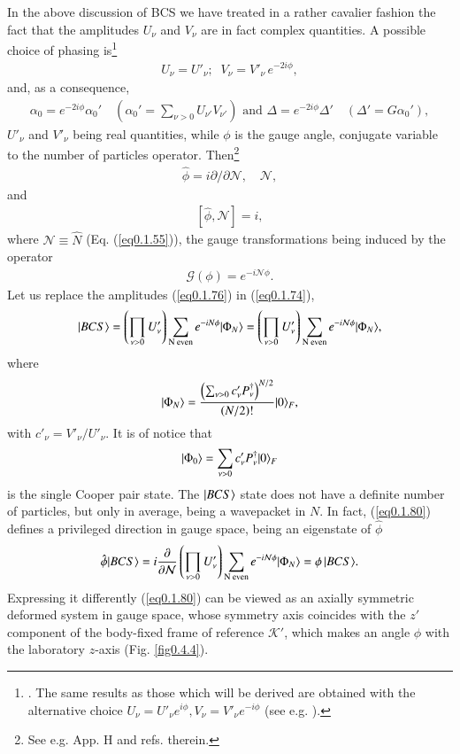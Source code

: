  In the above discussion of BCS we have treated in a rather cavalier fashion the fact that the amplitudes $U_\nu$ and $V_\nu$ are in fact complex quantities. A possible choice of phasing is\footnote{\cite{Schrieffer:73}. The same results as those which will be derived are obtained with the alternative choice $U_\nu=U'_\nu e^{i\phi},V_\nu=V'_\nu e^{-i\phi}$ (see e.g. \cite{Potel:13b}).} 
\begin{align}\label{eq0.1.76}
U_\nu=U'_\nu;\;\;V_\nu=V'_\nu\, e^{-2i\phi},
\end{align}
and, as a consequence, 
\begin{align}\label{eq0.1.76x}
\alpha_0=e^{-2i\phi}\alpha_0'\quad(\alpha_0'=\sum_{\nu>0}U_{\nu'}V_{\nu'})\text{ and } \Delta=e^{-2i\phi}\Delta'\quad(\Delta'=G\alpha_0'),
\end{align}
$U'_\nu$ and $V'_\nu$ being real quantities, while $\phi$ is the gauge angle, conjugate variable to the number of particles operator. Then\footnote{See e.g. \cite{Brink:05} App. H and refs. therein.}
\begin{align}\label{eq0.1.77}
\hat\phi=i\partial/\partial \mathcal N,\quad \mathcal N,
\end{align}
and
\begin{align}\label{eq0.1.78}
\left[\hat \phi,\mathcal N\right]=i,
\end{align}
where $\mathcal N\equiv\hat N$ (Eq. (\ref{eq0.1.55})), the gauge transformations being induced by the operator 
\begin{align}\label{eq0.1.79}
\mathcal G(\phi)=e^{-i\mathcal N\phi}.
\end{align}
Let us replace the amplitudes (\ref{eq0.1.76}) in  (\ref{eq0.1.74}),
\begin{align}\label{eq0.1.80}
|{BCS} \rangle=\left(\prod_{\nu>0}U'_\nu\right)\sum_{\text{N even}}e^{-iN\phi}|{\Phi_{N}} \rangle=\left(\prod_{\nu>0}U'_\nu\right)\sum_{\text{N even}}e^{-i\mathcal N\phi}|{\Phi_{N}} \rangle,
\end{align}
where
\begin{align}\label{eq0.1.81}
|{\Phi_{N}} \rangle=\frac{\left(\sum_{\nu>0}c'_\nu P^\dagger_\nu\right)^{N/2}}{\left(N/2\right)!}|{0} \rangle_F,
\end{align}
with $c'_\nu=V'_\nu/U'_\nu$. It is of notice that
\begin{align}\label{eq0.1.82}
|{\Phi_0} \rangle=\sum_{\nu>0}c'_\nu P^\dagger_\nu|{0} \rangle_F
\end{align}
is the single Cooper pair state.  The  $|{BCS} \rangle$ state does not have a definite number of particles, but only in average, being a wavepacket in $N$. 
In fact, (\ref{eq0.1.80}) defines a privileged direction in gauge space, being an eigenstate of $\hat\phi$ 
\begin{align}\label{eq0.1.83}
\hat\phi|{BCS} \rangle=i\frac{\partial}{\partial \mathcal N}\left(\prod_{\nu>0}U'_\nu\right)\sum_{\text{N even}}e^{-i\mathcal N\phi}|{\Phi_{N}} \rangle=\phi\,|{BCS} \rangle.
\end{align}
Expressing it differently (\ref{eq0.1.80}) can be viewed as an axially symmetric deformed system in gauge space, whose symmetry axis coincides with the $z'$ component of the body-fixed frame of reference $\mathcal K'$, which makes an angle $\phi$ with the laboratory $z$-axis (Fig. \ref{fig0.4.4}). 

